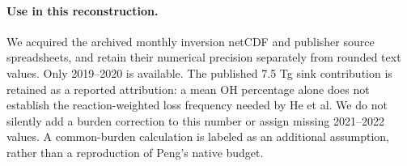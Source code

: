 \documentclass[11pt]{article}
\begin{document}
\paragraph{Use in this reconstruction.} We acquired the archived monthly inversion
netCDF and publisher source spreadsheets, and retain their numerical precision
separately from rounded text values. Only 2019--2020 is available. The published
7.5 Tg sink contribution is retained as a reported attribution: a mean OH
percentage alone does not establish the reaction-weighted loss frequency needed
by He et al. We do not silently add a burden correction to this number or assign
missing 2021--2022 values. A common-burden calculation is labeled as an additional
assumption, rather than a reproduction of Peng's native budget.
\end{document}
